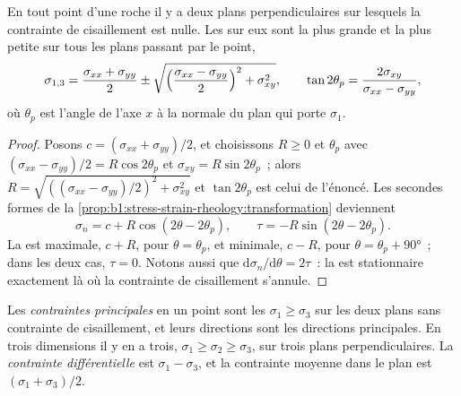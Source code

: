\begin{theorem}\label{thm:b1:stress-strain-rheology:principal}
En tout point d'une roche il y a deux plans perpendiculaires sur lesquels la contrainte de
cisaillement est nulle. Les  sur eux sont la plus grande et la plus petite
 sur tous les plans passant par le point,
\[
  \sigma_{1,3} = \frac{\sigma_{xx}+\sigma_{yy}}{2} \pm
  \sqrt{\Bigl(\frac{\sigma_{xx}-\sigma_{yy}}{2}\Bigr)^2 + \sigma_{xy}^2},
  \qquad \tan2\theta_p = \frac{2\sigma_{xy}}{\sigma_{xx}-\sigma_{yy}},
\]
où $\theta_p$ est l'angle de l'axe $x$ à la normale du plan
qui porte $\sigma_1$.
\end{theorem}

\begin{proof}
Posons $c = (\sigma_{xx}+\sigma_{yy})/2$, et choisissons $R \ge 0$ et $\theta_p$
avec $(\sigma_{xx}-\sigma_{yy})/2 = R\cos2\theta_p$ et
$\sigma_{xy} = R\sin2\theta_p$~; alors
$R = \sqrt{((\sigma_{xx}-\sigma_{yy})/2)^2 + \sigma_{xy}^2}$ et
$\tan2\theta_p$ est celui de l'énoncé. Les secondes formes de la
\cref{prop:b1:stress-strain-rheology:transformation} deviennent
\[
  \sigma_n = c + R\cos(2\theta - 2\theta_p), \qquad \tau = -R\sin(2\theta - 2\theta_p).
\]
La  est maximale, $c + R$, pour $\theta = \theta_p$, et minimale,
$c - R$, pour $\theta = \theta_p + \ang{90}$~; dans les deux cas, $\tau = 0$. Notons aussi
que $\mathrm d\sigma_n/\mathrm d\theta = 2\tau$~: la  est
stationnaire exactement là où la contrainte de cisaillement s'annule.
\end{proof}

\begin{definition}\label{def:b1:stress-strain-rheology:principal}
Les \emph{contraintes principales} en un point sont les
 $\sigma_1 \ge \sigma_3$ sur les deux plans sans contrainte de
cisaillement, et leurs directions sont les directions principales. En trois
dimensions il y en a trois, $\sigma_1 \ge \sigma_2 \ge \sigma_3$, sur trois
plans perpendiculaires. La \emph{contrainte différentielle} est
$\sigma_1 - \sigma_3$, et la contrainte moyenne dans le plan est
$(\sigma_1+\sigma_3)/2$.
\end{definition}

